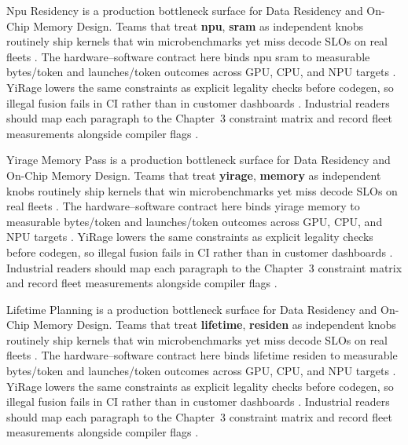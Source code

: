 Npu Residency is a production bottleneck surface for Data Residency and On-Chip Memory Design. Teams that treat \textbf{npu}, \textbf{sram} as independent knobs routinely ship kernels that win microbenchmarks yet miss decode SLOs on real fleets \citep{dlbook,nvidia2024cudagraphs}. The hardware--software contract here binds npu sram to measurable bytes/token and launches/token outcomes across GPU, CPU, and NPU targets \citep{dao2022flashattention,liu2024deepseekv3}. YiRage lowers the same constraints as explicit legality checks before codegen, so illegal fusion fails in CI rather than in customer dashboards \citep{kwon2023vllm,patel2025llminference}. Industrial readers should map each paragraph to the Chapter~3 constraint matrix and record fleet measurements alongside compiler flags \citep{nvidia2024cudagraphs,taxbreak2026}.

Yirage Memory Pass is a production bottleneck surface for Data Residency and On-Chip Memory Design. Teams that treat \textbf{yirage}, \textbf{memory} as independent knobs routinely ship kernels that win microbenchmarks yet miss decode SLOs on real fleets \citep{dao2022flashattention,liu2024deepseekv3}. The hardware--software contract here binds yirage memory to measurable bytes/token and launches/token outcomes across GPU, CPU, and NPU targets \citep{kwon2023vllm,patel2025llminference}. YiRage lowers the same constraints as explicit legality checks before codegen, so illegal fusion fails in CI rather than in customer dashboards \citep{nvidia2024cudagraphs,taxbreak2026}. Industrial readers should map each paragraph to the Chapter~3 constraint matrix and record fleet measurements alongside compiler flags \citep{liu2024deepseekv3,memoryfloor2026}.

Lifetime Planning is a production bottleneck surface for Data Residency and On-Chip Memory Design. Teams that treat \textbf{lifetime}, \textbf{residen} as independent knobs routinely ship kernels that win microbenchmarks yet miss decode SLOs on real fleets \citep{kwon2023vllm,patel2025llminference}. The hardware--software contract here binds lifetime residen to measurable bytes/token and launches/token outcomes across GPU, CPU, and NPU targets \citep{nvidia2024cudagraphs,taxbreak2026}. YiRage lowers the same constraints as explicit legality checks before codegen, so illegal fusion fails in CI rather than in customer dashboards \citep{liu2024deepseekv3,memoryfloor2026}. Industrial readers should map each paragraph to the Chapter~3 constraint matrix and record fleet measurements alongside compiler flags \citep{patel2025llminference,nvidia2022hopper}.


